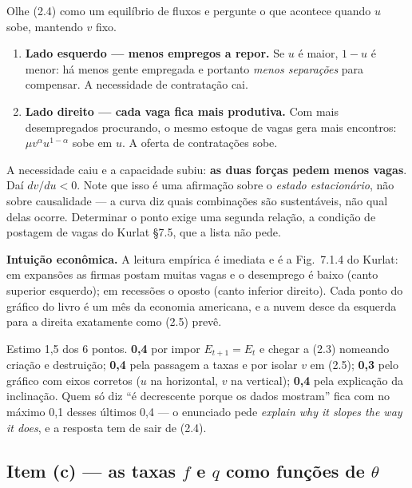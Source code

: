 \documentclass[11pt, a4paper]{article}
\newcommand{\intuicao}[1]{%
  \medskip\noindent\textcolor{midblue}{\textbf{Intuição econômica.}} #1\par}
\begin{document}
\begin{tcolorbox}[theorybox, title={Por que a curva é negativamente inclinada --- duas forças, mesmo sentido}]
\small
Olhe (2.4) como um equilíbrio de fluxos e pergunte o que acontece quando $u$ sobe,
mantendo $v$ fixo.
\begin{enumerate}[label=\arabic*.]
\item \textbf{Lado esquerdo --- menos empregos a repor.} Se $u$ é maior, $1-u$ é menor:
há menos gente empregada e portanto \emph{menos separações} para compensar. A necessidade
de contratação cai.
\item \textbf{Lado direito --- cada vaga fica mais produtiva.} Com mais desempregados
procurando, o mesmo estoque de vagas gera mais encontros: $\mu v^{\alpha}u^{1-\alpha}$
sobe em $u$. A oferta de contratações sobe.
\end{enumerate}
A necessidade caiu e a capacidade subiu: \textbf{as duas forças pedem menos vagas}. Daí
$dv/du<0$. Note que isso é uma afirmação sobre o \emph{estado estacionário}, não sobre
causalidade --- a curva diz quais combinações são sustentáveis, não qual delas ocorre.
Determinar o ponto exige uma segunda relação, a condição de postagem de vagas do Kurlat
§7.5, que a lista não pede.
\end{tcolorbox}

\intuicao{A leitura empírica é imediata e é a Fig.\ 7.1.4 do Kurlat: em expansões as firmas
postam muitas vagas e o desemprego é baixo (canto superior esquerdo); em recessões o
oposto (canto inferior direito). Cada ponto do gráfico do livro é um mês da economia
americana, e a nuvem desce da esquerda para a direita exatamente como (2.5) prevê.}

\begin{tcolorbox}[rubricbox]
\small
Estimo 1,5 dos 6 pontos. \textbf{0,4} por impor $E_{t+1}=E_t$ e chegar a (2.3) nomeando
criação e destruição; \textbf{0,4} pela passagem a taxas e por isolar $v$ em (2.5);
\textbf{0,3} pelo gráfico com eixos corretos ($u$ na horizontal, $v$ na vertical);
\textbf{0,4} pela explicação da inclinação. Quem só diz ``é decrescente porque os dados
mostram'' fica com no máximo 0,1 desses últimos 0,4 --- o enunciado pede \emph{explain why
it slopes the way it does}, e a resposta tem de sair de (2.4).
\end{tcolorbox}

\subsection*{Item (c) --- as taxas $f$ e $q$ como funções de $\theta$}
\end{document}
